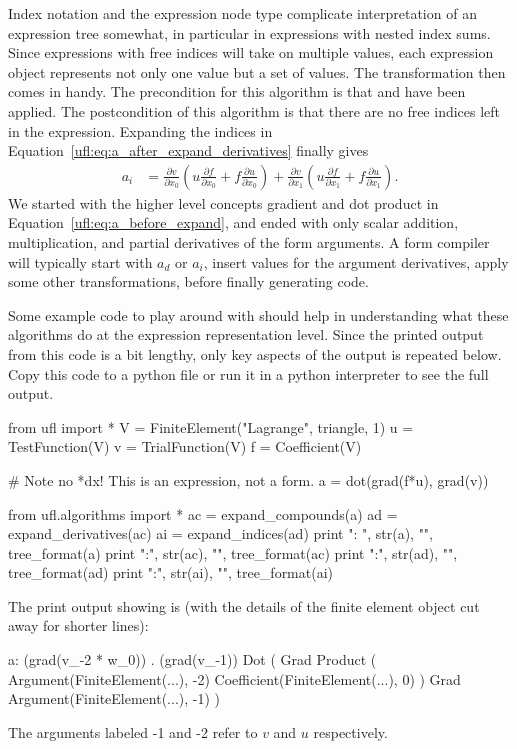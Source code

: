 Index notation and the  expression node type complicate
interpretation of an expression tree somewhat, in particular
in expressions with nested index sums.  Since expressions with
free indices will take on multiple values, each expression object
represents not only one value but a set of values.  The transformation
 then comes in handy.  The precondition for this
algorithm is that  and 
have been applied. The postcondition of this algorithm is that there
are no free indices left in the expression. Expanding the indices in
Equation~\eqref{ufl:eq:a_after_expand_derivatives} finally gives
\begin{align} \label{ufl:eq:a_after_expand_indices}
  a_i &= \frac{\partial v}{\partial x_0} (u \frac{\partial f}{\partial x_0}
      + f \frac{\partial u}{\partial x_0})
      + \frac{\partial v}{\partial x_1} (u \frac{\partial f}{\partial x_1}
      + f \frac{\partial u}{\partial x_1}).
\end{align}
We started with the higher level concepts gradient and dot product
in Equation~\eqref{ufl:eq:a_before_expand}, and ended with only scalar
addition, multiplication, and partial derivatives of the form arguments. A
form compiler will typically start with $a_d$ or $a_i$, insert values
for the argument derivatives, apply some other transformations, before
finally generating code.

Some example code to play around with should help in understanding what
these algorithms do at the expression representation level.  Since the
printed output from this code is a bit lengthy, only key aspects of the
output is repeated below. Copy this code to a python file or run it in
a python interpreter to see the full output.
\begin{python}
from ufl import *
V = FiniteElement("Lagrange", triangle, 1)
u = TestFunction(V)
v = TrialFunction(V)
f = Coefficient(V)

# Note no *dx! This is an expression, not a form.
a = dot(grad(f*u), grad(v))

from ufl.algorithms import *
ac = expand_compounds(a)
ad = expand_derivatives(ac)
ai = expand_indices(ad)
print "\na: ", str(a),  "\n", tree_format(a)
print "\nac:", str(ac), "\n", tree_format(ac)
print "\nad:", str(ad), "\n", tree_format(ad)
print "\nai:", str(ai), "\n", tree_format(ai)
\end{python}

The print output showing  is (with the details of the finite
element object cut away for shorter lines):
\begin{progoutput}
a:  (grad(v_{-2} * w_0)) . (grad(v_{-1}))
Dot
(
    Grad
        Product
        (
            Argument(FiniteElement(...), -2)
            Coefficient(FiniteElement(...), 0)
        )
    Grad
        Argument(FiniteElement(...), -1)
)
\end{progoutput}
The arguments labeled -1 and -2 refer to $v$ and $u$ respectively.

